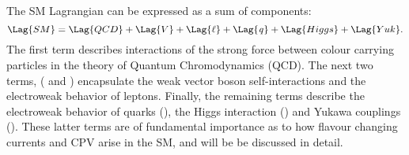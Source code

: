 The SM Lagrangian can be expressed as a sum of components:
\begin{equation}
  \Lag{SM} = \Lag{QCD} + \Lag{V} + \Lag{\ell} + \Lag{\it q} + \Lag{Higgs} + \Lag{Yuk}.
  \label{eq:th:lag}
\end{equation}
The first term describes interactions of the strong force between colour carrying particles in the
theory of Quantum Chromodynamics (QCD).
The next two terms, ( and \Lag{\ell}) encapsulate the weak vector boson self-interactions
and the electroweak behavior of leptons.
Finally, the remaining terms describe the electroweak behavior of quarks (), the Higgs
interaction () and
Yukawa couplings ().
These latter terms are of fundamental importance as to how flavour changing currents and CPV
arise in the SM, and will be be discussed in detail.

%


